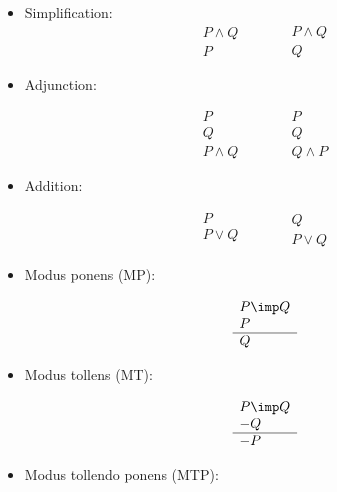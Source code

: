 \documentclass[11pt]{article}
\begin{document}
\begin{itemize}
\item[]{ Simplification:}
$$
\begin{array}{c}
P\land Q\\ \hline
P
\end{array}
\quad
\quad
\quad
\begin{array}{c}
P\land Q\\ \hline
Q
\end{array}
$$

\item[]{Adjunction:}

$$
\begin{array}{c}
P \\
Q \\ \hline
P \land Q
\end{array}
\quad
\quad
\quad
\begin{array}{c}
P \\
Q \\ \hline
Q \land P
\end{array}
$$

\item[]{Addition:}

$$
\begin{array}{c}
P \\ \hline

P \lor Q \\
\end{array}
\quad
\quad
\quad
\begin{array}{c}
Q \\ \hline
P \lor Q
\end{array}
$$

\item[]{Modus ponens (MP):}

$$
\begin{array}{l}
P \imp Q \\ 
P \\ \hline
Q \\ 
\end{array}
$$

\item[]{Modus tollens (MT):}

$$
\begin{array}{l}
P \imp Q \\ 
-Q \\ \hline
-P \\ 
\end{array}
$$
\item[]{Modus tollendo ponens (MTP):}


\end{itemize}
\end{document}
